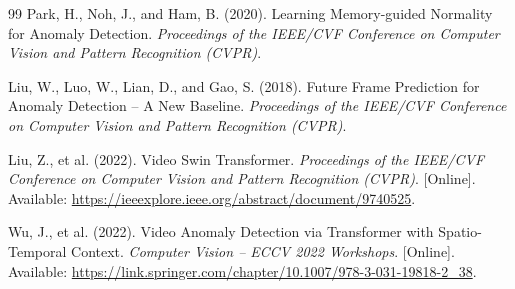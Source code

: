 \begin{thebibliography}{99}
 Park, H., Noh, J., and Ham, B. (2020). Learning Memory-guided Normality for Anomaly Detection. \textit{Proceedings of the IEEE/CVF Conference on Computer Vision and Pattern Recognition (CVPR)}.

 Liu, W., Luo, W., Lian, D., and Gao, S. (2018). Future Frame Prediction for Anomaly Detection -- A New Baseline. \textit{Proceedings of the IEEE/CVF Conference on Computer Vision and Pattern Recognition (CVPR)}.

 Liu, Z., et al. (2022). Video Swin Transformer. \textit{Proceedings of the IEEE/CVF Conference on Computer Vision and Pattern Recognition (CVPR)}. [Online]. Available: \url{https://ieeexplore.ieee.org/abstract/document/9740525}.

 Wu, J., et al. (2022). Video Anomaly Detection via Transformer with Spatio-Temporal Context. \textit{Computer Vision -- ECCV 2022 Workshops}. [Online]. Available: \url{https://link.springer.com/chapter/10.1007/978-3-031-19818-2_38}.

\end{thebibliography}
